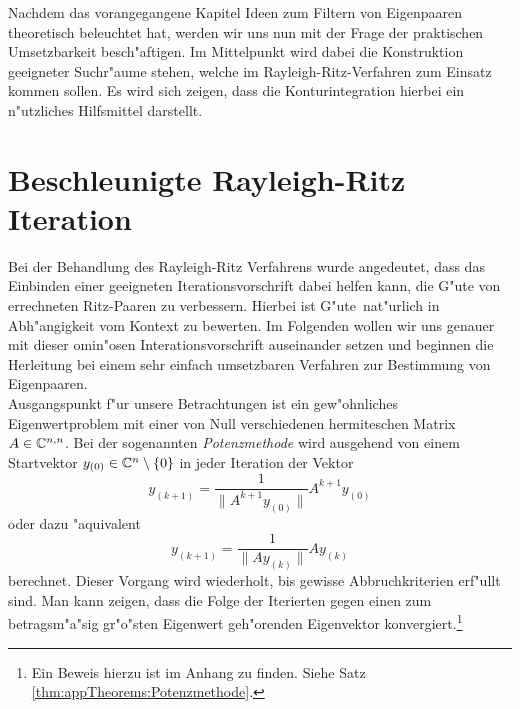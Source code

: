 Nachdem das vorangegangene Kapitel Ideen zum Filtern von Eigenpaaren theoretisch beleuchtet hat, werden wir uns nun mit der Frage der praktischen Umsetzbarkeit besch"aftigen.
Im Mittelpunkt wird dabei die Konstruktion geeigneter Suchr"aume stehen, welche im Rayleigh-Ritz-Verfahren zum Einsatz kommen sollen.
Es wird sich zeigen, dass die Konturintegration hierbei ein n"utzliches Hilfsmittel darstellt.

\section{Beschleunigte Rayleigh-Ritz Iteration}\label{chap4:beschrr}



Bei der Behandlung des Rayleigh-Ritz Verfahrens wurde angedeutet, dass das Einbinden einer geeigneten Iterationsvorschrift dabei helfen kann, die G"ute von errechneten Ritz-Paaren zu verbessern.
Hierbei ist \glqq G"ute\grqq\ nat"urlich in Abh"angigkeit vom Kontext zu bewerten. Im Folgenden wollen wir uns genauer mit dieser omin"osen Interationsvorschrift auseinander setzen und beginnen die Herleitung bei einem sehr einfach umsetzbaren Verfahren zur Bestimmung von Eigenpaaren.\\


Ausgangspunkt f"ur unsere Betrachtungen ist ein gew"ohnliches Eigenwertproblem mit einer von Null verschiedenen hermiteschen Matrix $A\in\mathbb{C}^{n,n}$. Bei der sogenannten \emph{Potenzmethode} wird
ausgehend von einem Startvektor $y_{(0)}\in\mathbb{C}^n \setminus\{0\}$ in jeder Iteration der Vektor
\[
y_{(k+1)} = \frac{1}{\|A^{k+1} y_{(0)}\|} A^{k+1}y_{(0)}
\]
oder dazu "aquivalent
\[
y_{(k+1)} = \frac{1}{\|Ay_{(k)}\|} Ay_{(k)}
\]
berechnet. Dieser Vorgang wird wiederholt, bis gewisse Abbruchkriterien erf"ullt sind. Man kann zeigen, dass die Folge der Iterierten gegen einen zum betragsm"a"sig gr"o"sten Eigenwert geh"orenden Eigenvektor konvergiert.\footnote{Ein Beweis hierzu ist im Anhang zu finden. Siehe Satz \ref{thm:appTheorems:Potenzmethode}.}

